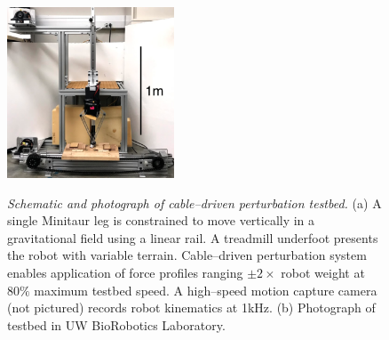 \documentclass[11pt]{article}
\begin{document}
\begin{figure}[h!]
\vspace{0.1cm}
{
\centering
\sf
\hfill
\def\svgwidth{0.3\columnwidth} 
\resizebox{!}{2in}{}
\hfill
\includegraphics[height=2in]{hopper_.png}
\hfill
}
\caption{\label{fig:hopper}
\emph{Schematic and photograph of cable--driven perturbation testbed.}
(a) A single Minitaur leg is constrained to move vertically in a gravitational field using a linear rail.
A treadmill underfoot presents the robot with variable terrain.
Cable--driven perturbation system enables application of force profiles ranging $\pm 2\times$ robot weight at $80\%$ maximum testbed speed.
A high--speed motion capture camera (not pictured) records robot kinematics at 1kHz.
(b) Photograph of testbed in UW BioRobotics Laboratory.
}
\end{figure}
\end{document}
